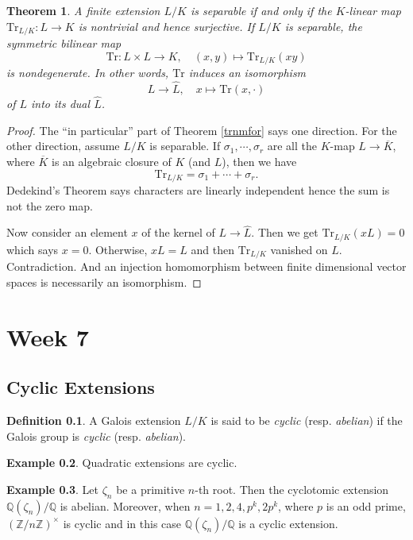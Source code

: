\documentclass[12pt]{report}
\newtheorem{theorem}{Theorem}[section]
\theoremstyle{definition}
\newtheorem{definition}[theorem]{Definition}
\newtheorem{example}[theorem]{Example}
\newcommand{\ok}{\overline{K}}
\newcommand{\ZZ}{\mathbb{Z}}
\newcommand{\QQ}{\mathbb{Q}}
\newcommand{\Tr}{\text{Tr}}
\begin{document}
\begin{theorem}
	A finite extension $L/K$ is separable if and only if the $K$-linear map $\Tr_{L/K}: L\to K$ is nontrivial and hence surjective. If $L/K$ is separable, the symmetric bilinear map $$\Tr:L\times L\to K,\quad (x,y)\mapsto \Tr_{L/K}(xy)$$ is nondegenerate. In other words, $\Tr$ induces an isomorphism $$L\to \hat{L}, \quad x\mapsto \Tr(x,\cdot)$$ of $L$ into its dual $\hat{L}$.
\end{theorem}

\begin{proof}
	The ``in particular'' part of Theorem \ref{trnmfor} says one direction. For the other direction, assume $L/K$ is separable. If $\sigma_1,\cdots,\sigma_r$ are all the $K$-map $L\to\overline{K}$, where $\ok$ is an algebraic closure of $K$ (and $L$), then we have $$\Tr_{L/K}=\sigma_1+\cdots+\sigma_r.$$ Dedekind's Theorem says characters are linearly independent hence the sum is not the zero map.


	Now consider an element $x$ of the kernel of $L\to \hat{L}$. Then we get $\Tr_{L/K}(xL)=0$ which says $x=0$. Otherwise, $xL=L$ and then $\Tr_{L/K}$ vanished on $L$. Contradiction. And an injection homomorphism between finite dimensional vector spaces is necessarily an isomorphism.
\end{proof}

\chapter*{Week 7}
\setcounter{chapter}{7}

\section{Cyclic Extensions}

\begin{definition}
	A Galois extension $L/K$ is said to be \emph{cyclic} (resp. \emph{abelian}) if the Galois group is \emph{cyclic} (resp. \emph{abelian}).
\end{definition}

\begin{example}
	Quadratic extensions are cyclic.
\end{example}

\begin{example}
	Let $\zeta_n$ be a primitive $n$-th root. Then the cyclotomic extension $\QQ(\zeta_n)/\QQ$ is abelian. Moreover, when $n=1,2,4,p^k,2p^k$, where $p$ is an odd prime, $(\ZZ/n\ZZ)^\times$ is cyclic and in this case $\QQ(\zeta_n)/\QQ$ is a cyclic extension.
\end{example}
\end{document}

